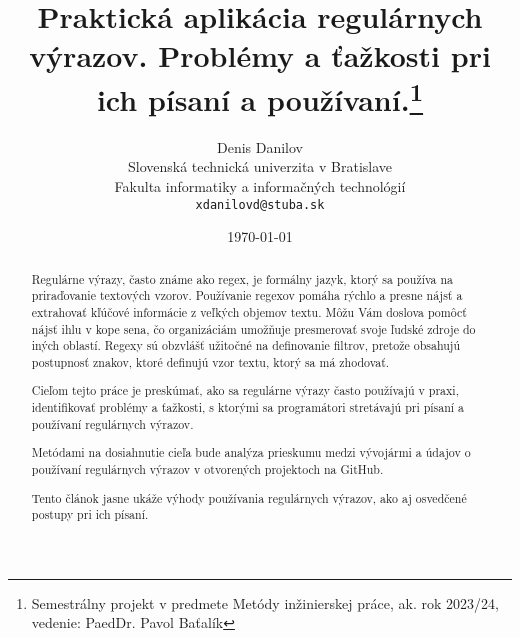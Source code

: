 \documentclass[10pt,twoside,slovak,a4paper]{article}
\title{Praktická aplikácia regulárnych výrazov. Problémy a ťažkosti pri ich písaní a používaní.\thanks{Semestrálny projekt v predmete Metódy inžinierskej práce, ak. rok 2023/24, vedenie: PaedDr. Pavol Baťalík}} %
\author{Denis Danilov\\[2pt]
	{\small Slovenská technická univerzita v Bratislave}\\
	{\small Fakulta informatiky a informačných technológií}\\
	{\small \texttt{xdanilovd@stuba.sk}}
	}
\date{\small \today} %
\begin{document}
\maketitle

\begin{abstract}
Regulárne výrazy, často známe ako regex, je formálny jazyk, ktorý sa používa na priraďovanie textových vzorov. Používanie regexov pomáha rýchlo a presne nájsť a extrahovať kľúčové informácie z veľkých objemov textu. Môžu Vám doslova pomôcť nájsť ihlu v kope sena, čo organizáciám umožňuje presmerovať svoje ľudské zdroje do iných oblastí. Regexy sú obzvlášť užitočné na definovanie filtrov, pretože obsahujú postupnosť znakov, ktoré definujú vzor textu, ktorý sa má zhodovať.
	
Cieľom tejto práce je preskúmať, ako sa regulárne výrazy často používajú v praxi, identifikovať problémy a ťažkosti, s ktorými sa programátori stretávajú pri písaní a používaní regulárnych výrazov.
	
Metódami na dosiahnutie cieľa bude analýza prieskumu medzi vývojármi a údajov o používaní regulárnych výrazov v otvorených projektoch na GitHub.
	
Tento článok jasne ukáže výhody používania regulárnych výrazov, ako aj osvedčené postupy pri ich písaní.

\end{abstract}
\end{document}
